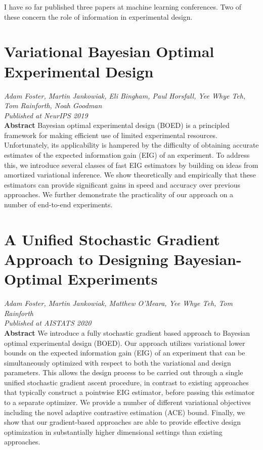 I have so far published three papers at machine learning conferences. Two of these concern the role of information in experimental design.

\section{Variational Bayesian Optimal Experimental Design}
\textit{Adam Foster, Martin Jankowiak, Eli Bingham, Paul Horsfall, Yee Whye Teh, Tom Rainforth, Noah Goodman \\
Published at NeurIPS 2019 \\
}
\textbf{Abstract}  Bayesian optimal experimental design (BOED) is a principled framework for making efficient use of limited experimental resources. Unfortunately, its applicability is hampered by the difficulty of obtaining accurate estimates of the expected information gain (EIG) of an experiment. To address this, we introduce several classes of fast EIG estimators by building on ideas from amortized variational inference. We show theoretically and empirically that these estimators can provide significant gains in speed and accuracy over previous approaches. We further demonstrate the practicality of our approach on a number of end-to-end experiments. 

\section{A Unified Stochastic Gradient Approach to Designing Bayesian-Optimal Experiments}
\textit{Adam Foster, Martin Jankowiak, Matthew O'Meara, Yee Whye Teh, Tom Rainforth \\
	Published at AISTATS 2020 \\
}
\textbf{Abstract}      We introduce a fully stochastic gradient based approach to Bayesian optimal experimental design (BOED). Our approach utilizes variational lower bounds on the expected information gain (EIG) of an experiment that can be simultaneously optimized with respect to both the variational and design parameters. This allows the design process to be carried out through a single unified stochastic gradient ascent procedure, in contrast to existing approaches that typically construct a pointwise EIG estimator, before passing this estimator to a separate optimizer. We provide a number of different variational objectives including the novel adaptive contrastive estimation (ACE) bound. Finally, we show that our gradient-based approaches are able to provide effective design optimization in substantially higher dimensional settings than existing approaches. 



